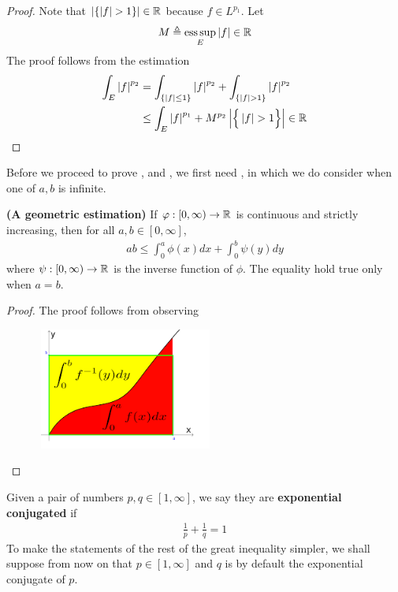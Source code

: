 \documentclass{report}
\begin{document}
\begin{proof}
Note that $\abso{\set{\abso{f}>1}}\inr$ because $f\in L^{p_1}$. Let 
\begin{align*}
M\triangleq \operatorname*{ess\,sup}_E \left|f\right| \in\mathbb{R}
\end{align*}
The proof follows from the estimation 
 \begin{align*}
\int_E \abso{f}^{p_2}&= \int_{\set{\abso{f}\leq 1}} \abso{f}^{p_2} + \int_{\set{\abso{f}>1}} \abso{f}^{p_2}\\
&\leq \int_E \abso{f}^{p_1}+ M^{p_2} \abso{\bset{\abso{f}>1}} \inr
\end{align*}
\end{proof}
\begin{mdframed}
  Before we proceed to prove ,   and , we first need  , in which we do consider when one of  $a,b$ is infinite.  
\end{mdframed}
\begin{lemma}
\label{PYI}
\textbf{(A geometric estimation)} If $\varphi:[0,\infty)\rightarrow \mathbb{R}$ is continuous and strictly increasing, then for all $a,b \in [0,\infty]$, 
\begin{align*}
ab\leq  \int_0^a \phi (x)dx + \int_0^b \psi(y)dy
\end{align*}
where $\psi: [0,\infty)\rightarrow \mathbb{R}$ is the inverse function of $\phi$. The equality hold true only when $a=b$.  
\end{lemma}
\begin{proof}
The proof follows from observing 
\begin{center}
   \begin{minipage}{0.9\linewidth}  
       \centering       
\includegraphics[height=4cm,width=8cm]{young}
   \end{minipage}
\end{center}
\end{proof}
\begin{mdframed}
Given a pair of numbers $p,q\in [1,\infty]$, we say they are \textbf{exponential conjugated} if 
\begin{align*}
\frac{1}{p}+ \frac{1}{q}= 1
\end{align*}
To make the statements of the rest of the great inequality simpler, we shall suppose from now on that $p \in [1,\infty]$ and $q$ is by default the exponential conjugate of  $p$. 
\end{mdframed}
\end{document}
